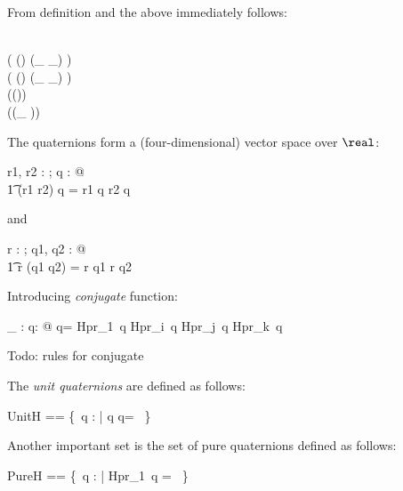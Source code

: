 \documentclass[12pt]{article}
\begin{document}
% 
From definition and the above immediately follows:
\begin{zed}
  \real \subset \quaternions \\
  \ran ( (\quaternions \cross \quaternions) \dres (\_ \aplus \_) ) \subset \quaternions\\
  \ran ( (\quaternions \cross \quaternions) \dres (\_ \amult \_) ) \subset \quaternions\\
  \ran (\quaternions \dres (\aneg ))  \subset \quaternions\\
  \ran (\quaternions \dres (\_ \ainv ))  \subset \quaternions\\
\end{zed}
%
The quaternions form a (four-dimensional) vector space over $\real$:
\begin{zed}
  \forall r1, r2 : \real; q : \quaternions @\\
  \t1 (r1 \aplus r2) \amult q = r1 \amult q \aplus r2 \amult q
\end{zed}
%
and
%
\begin{zed}
  \forall r : \real; q1, q2 : \quaternions @\\
  \t1 r \amult (q1 \aplus q2) = r \amult q1 \aplus r \amult q2 \\
\end{zed}
%
Introducing \emph{conjugate} function:
\begin{axdef}
  \_ \aconj : \quaternions \fun \quaternions
  \where
  \forall q: \quaternions @ q\aconj = Hpr\_1~q \amult \aone \aminus
  Hpr\_i~q \amult \iu \aminus Hpr\_j~q \amult \ju \aminus Hpr\_k~q \amult \ku
\end{axdef}
%
Todo: rules for conjugate
%

The \emph{unit quaternions} are defined as follows:
\begin{zed}
  UnitH == \{~q : \quaternions | q \amult q\aconj = \aone~\}
\end{zed}
%
Another important set is the set of pure quaternions defined as
follows:
\begin{zed}
  PureH == \{~q : \quaternions | Hpr\_1~q = \azero~\}
\end{zed}

\end{document}
